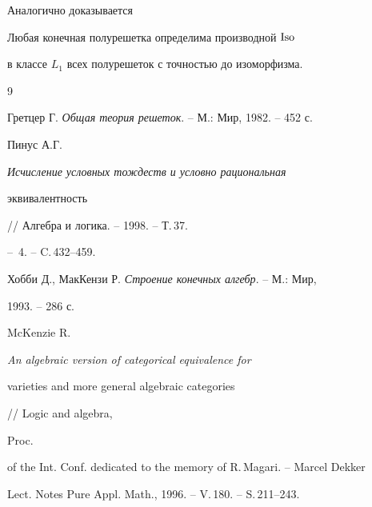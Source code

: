  


Аналогично доказывается 


 


\begin{cor} 


Любая конечная полурешетка определима производной $\operatorname{Iso}$ 


в классе $L_1$ всех полурешеток с точностью до изоморфизма. 


\end{cor} 


 


\begin{thebibliography}{9} 


 




Гретцер Г. {\em Общая теория решеток}. -- М.: Мир, 1982. -- 452 с. 




Пинус А.Г. {\em Исчисление условных тождеств и условно рациональная 


эквивалентность} // Алгебра и логика. -- 1998. -- Т.\,37. 


-- \No\,4. -- C.\,432--459. 




Хобби Д., МакКензи Р. {\em Строение конечных алгебр}. -- М.: Мир, 


1993. -- 286 с. 




McKenzie R. {\em An algebraic version of categorical equivalence for 


varieties and more general algebraic categories} // Logic and algebra, 


Proc. 


of the Int. Conf. dedicated to the memory of R.\,Magari. -- Marcel Dekker 


Lect. Notes Pure Appl. Math., 1996. -- V.\,180. -- S.\,211--243. 


 


\end{thebibliography} 


 


\vskip 2cm 


 








 


\label{end} 


 



